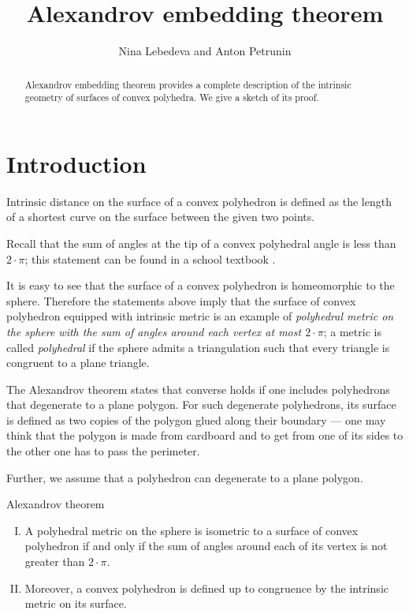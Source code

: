 \documentclass[oneside,a4paper]{article}
\begin{document}

\title{Alexandrov embedding theorem}
\author{Nina Lebedeva and Anton Petrunin}
\date{}
\maketitle

\begin{abstract}
Alexandrov embedding theorem provides a complete description of the intrinsic geometry of surfaces of convex polyhedra.
We give a sketch of its proof.
\end{abstract}

\section{Introduction}

Intrinsic distance on the surface of a convex polyhedron is defined as the length of a shortest curve on the surface between the given two points.

Recall that the sum of angles at the tip of a convex polyhedral angle is less than $2\cdot\pi$;
this statement can be found in a school textbook \cite[§~48]{kiselyov-3D}.

It is easy to see that the surface of a convex polyhedron is homeomorphic to the sphere.
Therefore the statements above imply that the surface of convex polyhedron equipped with intrinsic metric is an example of \emph{polyhedral metric on the sphere with the sum of angles around each vertex at most $2\cdot\pi$};
a metric is called \emph{polyhedral} if the sphere admits a triangulation such that every triangle is congruent to a plane triangle.

The Alexandrov theorem states that converse holds if one includes polyhedrons that degenerate to a plane polygon.
For such degenerate polyhedrons, its surface is defined as two copies of the polygon glued along their boundary --- one may think that the polygon is made from cardboard and to get from one of its sides to the other one has to pass the perimeter.

Further, we assume that a polyhedron can degenerate to a plane polygon.

\begin{thm}{Alexandrov theorem}
\begin{enumerate}[I.]
\item\label{thm:exist}
A polyhedral metric on the sphere is isometric to a surface of convex polyhedron if and only if the sum of angles around each of its vertex is not greater than $2\cdot\pi$.

\item\label{thm:unique} 
Moreover, a convex polyhedron is defined up to congruence by the intrinsic metric on its surface.
\end{enumerate}

\end{thm}
\end{document}
